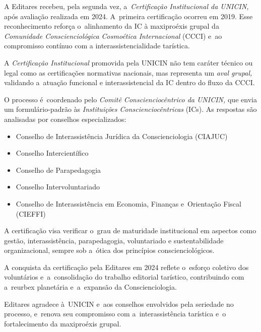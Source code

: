 \documentclass{gescons}
\begin{document}

A Editares recebeu, pela segunda vez, a~\emph{Certificação Institucional
da UNICIN,} após avaliação realizada em 2024. A~primeira certificação
ocorreu em 2019. Esse reconhecimento reforça o~alinhamento da IC à
maxiproéxis grupal da \emph{Comunidade Conscienciológica Cosmoética
Internacional} (CCCI) e~ao compromisso contínuo com a
interassistencialidade tarística.

A \emph{Certificação Institucional} promovida pela UNICIN não tem
caráter técnico ou legal como as certificações normativas nacionais, mas
representa um \emph{aval grupal,} validando a~atuação funcional e
interassistencial da IC dentro do fluxo da CCCI.

O processo é~coordenado pelo \emph{Comitê Conscienciocêntrico da
UNICIN,} que envia um formulário-padrão às \emph{Instituições
Conscienciocêntricas} (ICs). As respostas são analisadas por conselhos
especializados:

\begin{itemize}
\item
  Conselho de Interassistência Jurídica da Conscienciologia (CIAJUC)
\item
  Conselho Intercientífico
\item
  Conselho de Parapedagogia
\item
  Conselho Intervoluntariado
\item
  Conselho de Interassistência em Economia, Finanças e~Orientação Fiscal
  (CIEFFI)
\end{itemize}

A certificação visa verificar o~grau de maturidade institucional em
aspectos como gestão, interassistência, parapedagogia, voluntariado e
sustentabilidade organizacional, sempre sob a~ótica dos princípios
conscienciológicos.

A conquista da certificação pela Editares em 2024 reflete o~esforço
coletivo dos voluntários e~a~consolidação do trabalho editorial
tarístico, contribuindo com a~reurbex planetária e~a~expansão da
Conscienciologia.

Editares agradece à~UNICIN e~aos conselhos envolvidos pela seriedade no
processo, e~renova seu compromisso com a~interassistência tarística e~o
fortalecimento da maxiproéxis grupal.





        
\end{document}
